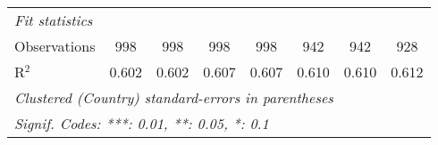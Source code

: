 \begin{tabular}{lccccccc}
   \midrule \emph{Fit statistics}\\
   Observations                                                                           & 998     & 998     & 998          & 998          & 942          & 942          & 928\\  
   R$^2$                                                                                  & 0.602   & 0.602   & 0.607        & 0.607        & 0.610        & 0.610        & 0.612\\  
   \midrule
   \multicolumn{8}{l}{\emph{Clustered (Country) standard-errors in parentheses}}\\
   \multicolumn{8}{l}{\emph{Signif. Codes: ***: 0.01, **: 0.05, *: 0.1}}\\
\end{tabular}
\par\endgroup


